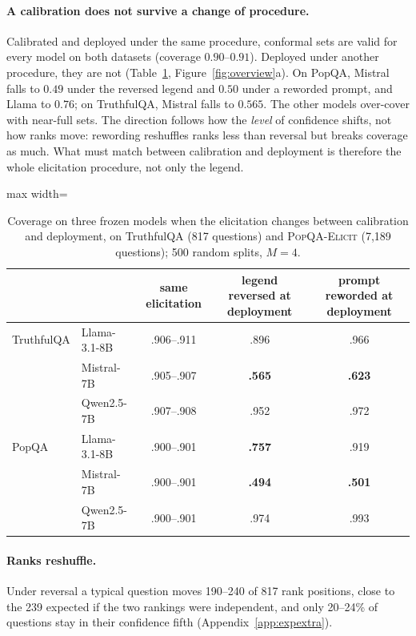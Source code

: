 \documentclass[twoside]{article}
\theoremstyle{definition}
\theoremstyle{remark}
\newcommand{\1}{\mathbf{1}}
\newcommand{\expname}[1]{\textsc{#1}}
\begin{document}
\paragraph{A calibration does not survive a change of procedure.} Calibrated and deployed under the
same procedure, conformal sets are valid for every model on both datasets (coverage $0.90$--$0.91$). Deployed
under another procedure, they are not (Table~\ref{tab:coverage}, Figure~\ref{fig:overview}a). On PopQA, Mistral
falls to $0.49$ under the reversed legend and $0.50$ under a reworded prompt, and Llama to $0.76$; on TruthfulQA,
Mistral falls to $0.565$. The other models over-cover with near-full sets. The direction follows how the
\emph{level} of confidence shifts, not how ranks move: rewording reshuffles ranks less than reversal but breaks
coverage as much. What must match between calibration and deployment is therefore the whole elicitation
procedure, not only the legend.
\begin{table}[t]
\caption{Coverage on three frozen models when the elicitation changes between calibration and deployment, on TruthfulQA (817 questions) and \expname{PopQA-Elicit} (7{,}189 questions); 500 random splits, $M=4$.}
\centering\small
\begin{adjustbox}{max width=\textwidth}
\begin{tabular}{llccc}
\toprule
 & & same elicitation & legend reversed at deployment & prompt reworded at deployment\\
\midrule
TruthfulQA & Llama-3.1-8B & .906--.911 & .896 & .966\\
 & Mistral-7B   & .905--.907 & \textbf{.565} & \textbf{.623}\\
 & Qwen2.5-7B   & .907--.908 & .952 & .972\\
PopQA & Llama-3.1-8B & .900--.901 & \textbf{.757} & .919\\
 & Mistral-7B   & .900--.901 & \textbf{.494} & \textbf{.501}\\
 & Qwen2.5-7B   & .900--.901 & .974 & .993\\
\bottomrule
\end{tabular}
\label{tab:coverage}
\end{adjustbox}
\end{table}

\paragraph{Ranks reshuffle.} Under reversal a typical question moves 190--240 of 817 rank positions, close to
the 239 expected if the two rankings were independent, and only 20--24\% of questions stay in their confidence
fifth (Appendix~\ref{app:expextra}).
\end{document}
